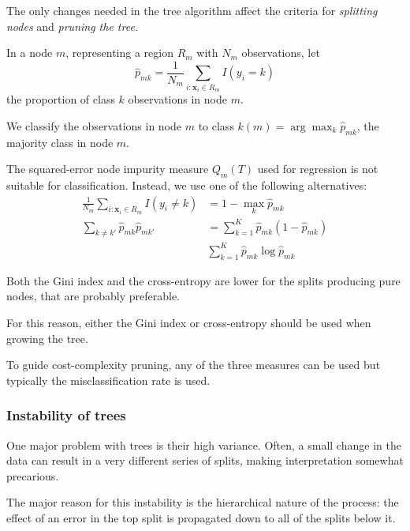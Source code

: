 The only changes needed in the tree algorithm affect the criteria for
\emph{splitting nodes} and \emph{pruning the tree}.

In a node $m$, representing a region $R_m$ with $N_m$ observations, let
\begin{equation*}
	\hat{p}_{mk} = \frac{1}{N_m} \sum_{i: \boldsymbol x_i \in R_m} I(y_i = k)
\end{equation*}
the proportion of class $k$ observations in node $m$.

We classify the observations in node $m$ to class $k(m) = \arg\max_k \hat{p}_{mk}$,
the majority class in node $m$.

The squared-error node impurity measure $Q_m(T)$ used for regression is not
suitable for classification. Instead, we use one of the following alternatives:
\begin{align}
	\frac{1}{N_m} \sum_{i: \boldsymbol x_i \in R_m} I(y_i \neq k) & = 1 - \max_k \hat{p}_{mk} \tag{misclassification error}                     \\
	\sum_{k\neq k'} \hat{p}_{mk} \hat{p}_{m k'}                   & = \sum_{k=1}^K \hat{p}_{mk} (1 - \hat{p}_{mk}) \tag{Gini index}             \\
	                                                              & \sum_{k=1}^K \hat{p}_{mk} \log \hat{p}_{mk} \tag{cross-entropy or deviance}
\end{align}

\begin{note}
	Both the Gini index and the cross-entropy are lower for the splits producing pure nodes, that are probably
	preferable.

	For this reason, either the Gini index or cross-entropy should be used when growing the tree.

	To guide cost-complexity pruning, any of the three measures can be used but typically
	the misclassification rate is used.
\end{note}

\subsubsection{Instability of trees}

One major problem with trees is their high variance. Often, a small change in the data can result in a very
different series of splits, making interpretation somewhat precarious.

The major reason for this instability is the hierarchical nature of the process:
the effect of an error in the top split is propagated down to all of the splits below it.

